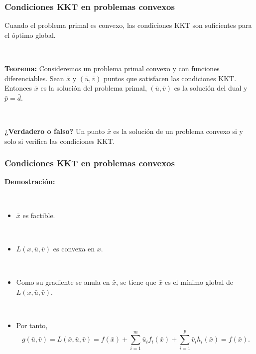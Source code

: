 \documentclass{beamer}
\begin{document}
\begin{frame}
\frametitle{Condiciones KKT en problemas convexos}


Cuando el problema primal es convexo, las condiciones KKT son suficientes para el óptimo global.

\


\textbf{Teorema:} Consideremos un problema primal convexo y con funciones diferenciables. Sean $\bar{x}$ y $(\bar{u},\bar{v})$ puntos que satisfacen las condiciones KKT. Entonces $\bar{x}$ es la solución del problema primal, $(\bar{u},\bar{v})$ es la solución del dual y  $\bar{p} =  \bar{d}$.

\

\textbf{¿Verdadero o falso?} Un punto $\bar{x}$ es la solución de un problema convexo si y solo si verifica las condiciones KKT.


\end{frame}
\begin{frame}
\frametitle{Condiciones KKT en problemas convexos}

\textbf{Demostración:}

\

\begin{itemize}
\item $\bar{x}$ es factible.

\

\item $L(x,\bar{u},\bar{v})$ es convexa en $x$.

\

\item Como su gradiente se anula en $\bar{x}$, se tiene que $\bar{x}$ es el mínimo global de $L(x,\bar{u},\bar{v})$.

\

\item  Por tanto,
\[
g(\bar{u},\bar{v}) = L(\bar{x},\bar{u},\bar{v}) = 
 f(\bar{x}) + \sum_{i=1}^m \bar{u}_i  f_i(\bar{x}) + \sum_{i=1}^p \bar{v}_i h_i(\bar{x}) = f(\bar{x}).
\]

\end{itemize}


\end{frame}
\end{document}
